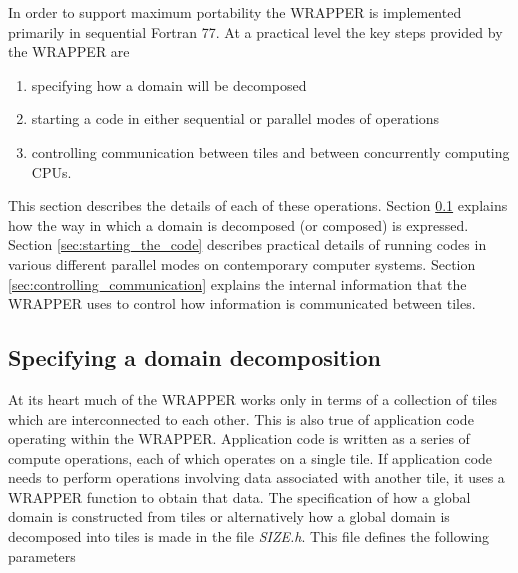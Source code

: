 In order to support maximum portability the WRAPPER is implemented
primarily in sequential Fortran 77. At a practical level the key steps
provided by the WRAPPER are
\begin{enumerate}
\item specifying how a domain will be decomposed
\item starting a code in either sequential or parallel modes of operations
\item controlling communication between tiles and between concurrently
  computing CPUs.
\end{enumerate} 
This section describes the details of each of these operations.
Section \ref{sec:specifying_a_decomposition} explains how the way in
which a domain is decomposed (or composed) is expressed. Section
\ref{sec:starting_the_code} describes practical details of running
codes in various different parallel modes on contemporary computer
systems.  Section \ref{sec:controlling_communication} explains the
internal information that the WRAPPER uses to control how information
is communicated between tiles.

\subsection{Specifying a domain decomposition}
\label{sec:specifying_a_decomposition}

At its heart much of the WRAPPER works only in terms of a collection of tiles
which are interconnected to each other. This is also true of application
code operating within the WRAPPER. Application code is written as a series
of compute operations, each of which operates on a single tile. If
application code needs to perform operations involving data
associated with another tile, it uses a WRAPPER function to obtain
that data.
The specification of how a global domain is constructed from tiles or alternatively
how a global domain is decomposed into tiles is made in the file {\em SIZE.h}.
This file defines the following parameters \\

 \\

